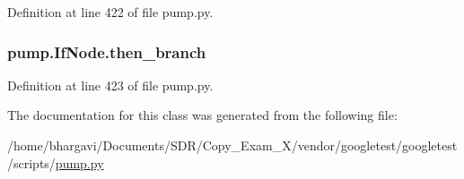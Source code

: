 Definition at line 422 of file pump.\+py.

\subsubsection[{\texorpdfstring{then\+\_\+branch}{then_branch}}]{\setlength{\rightskip}{0pt plus 5cm}pump.\+If\+Node.\+then\+\_\+branch}\hypertarget{classpump_1_1_if_node_aa9e2e488564629f8dc0d64d165a19ffa}{}\label{classpump_1_1_if_node_aa9e2e488564629f8dc0d64d165a19ffa}


Definition at line 423 of file pump.\+py.



The documentation for this class was generated from the following file\+:\begin{DoxyCompactItemize}
\item 
/home/bhargavi/\+Documents/\+S\+D\+R/\+Copy\+\_\+\+Exam\+\_\+X/vendor/googletest/googletest/scripts/\hyperlink{pump_8py}{pump.\+py}\end{DoxyCompactItemize}
